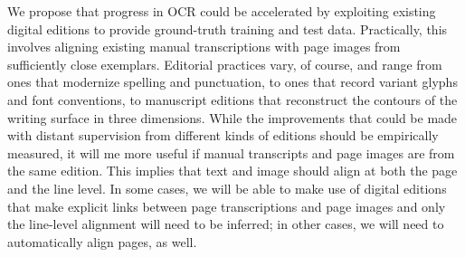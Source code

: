 \documentclass[twoside,11pt]{report}
\begin{document}
We propose that progress in OCR could be accelerated by exploiting existing digital editions to provide ground-truth training and test data. Practically, this involves aligning existing manual transcriptions with page images from sufficiently close exemplars. Editorial practices vary, of course, and range from ones that modernize spelling and punctuation, to ones that record variant glyphs and font conventions, to manuscript editions that reconstruct the contours of the writing surface in three dimensions. While the improvements that could be made with distant supervision from different kinds of editions should be empirically measured, it will me more useful if manual transcripts and page images are from the same edition. This implies that text and image should align at both the page and the line level. In some cases, we will be able to make use of digital editions that make explicit links between page transcriptions and page images and only the line-level alignment will need to be inferred; in other cases, we will need to automatically align pages, as well.
\end{document}
